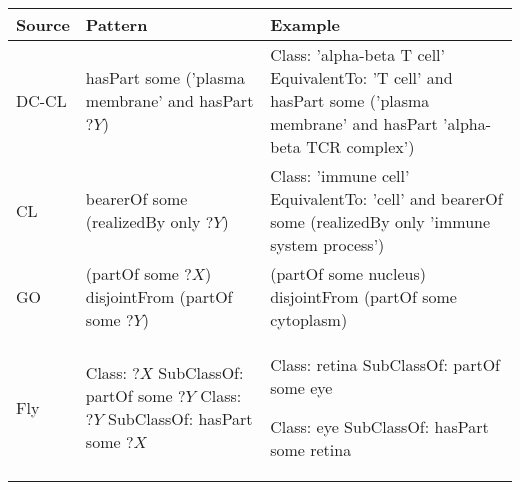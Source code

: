 \documentclass{llncs}
\begin{document}
  \begin{table}
    \begin{tabular}{ | p{1.1cm} | p{4cm} | p{7cm} | }
      \hline 
      \textbf{Source} & \textbf{Pattern} & \textbf{Example} \\
      \hline

      DC-CL &

      hasPart some ('plasma membrane' and hasPart $?Y$)

      &

      Class: 'alpha-beta T cell' \newline
      EquivalentTo: 'T cell' and 
      hasPart some ('plasma membrane' and hasPart 'alpha-beta TCR complex')

      \\

      \hline

      CL &

      bearerOf some (realizedBy only $?Y$)

      &

      Class: 'immune cell' \newline
      EquivalentTo: 'cell' and bearerOf some (realizedBy only 'immune system process')

      \\

      \hline

      GO &

      (partOf some $?X$) disjointFrom (partOf some $?Y$)

      &

      (partOf some nucleus) disjointFrom (partOf some cytoplasm)

      \\

      \hline

      Fly &

      Class: $?X$ \newline SubClassOf: partOf some $?Y$ \newline 
      Class: $?Y$ \newline SubClassOf: hasPart some $?X$

      &

      Class: retina \newline
      SubClassOf: partOf some eye \newline

      Class: eye \newline
      SubClassOf: hasPart some retina 
      \\


\end{tabular}
\end{table}
\end{document}
